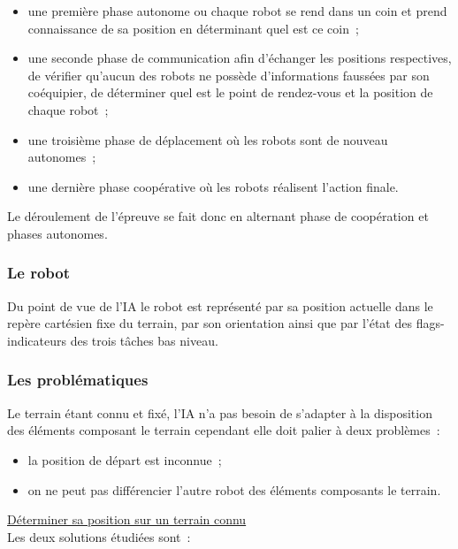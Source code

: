 \documentclass{article}
\begin{document}
\begin{itemize}
  \item une première phase autonome ou chaque robot se rend dans un coin et prend connaissance de sa position en déterminant quel est ce coin~;
  \item une seconde phase de communication afin d'échanger les positions respectives, de vérifier qu'aucun des robots ne possède d'informations faussées par son coéquipier, de déterminer quel est le point de rendez-vous et la position de chaque robot~;
  \item une troisième phase de déplacement où les robots sont de nouveau autonomes~;
  \item une dernière phase coopérative où les robots réalisent l'action finale. \\
\end{itemize}

Le déroulement de l'épreuve se fait donc en alternant phase de coopération et phases autonomes.

\subsubsection{Le robot}

Du point de vue de l'IA le robot est représenté par sa position actuelle dans le repère cartésien fixe du terrain, par son orientation ainsi que par l'état des flags-indicateurs des trois tâches bas niveau.

\subsubsection{Les problématiques}

Le terrain étant connu et fixé, l'IA n'a pas besoin de s'adapter à la disposition des éléments composant le terrain cependant elle doit palier à deux problèmes~: \\

\begin{itemize}
  \item la position de départ est inconnue~;
  \item on ne peut pas différencier l'autre robot des éléments composants le terrain. \\
\end{itemize}

\underline{Déterminer sa position sur un terrain connu} \\

Les deux solutions étudiées sont~: \\
\end{document}
